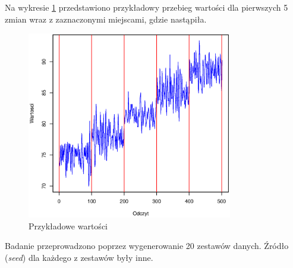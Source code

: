 Na wykresie \ref{fig:JumpingValues} przedstawiono przykładowy przebieg wartości dla pierwszych 5 zmian
wraz z zaznaczonymi miejscami,
gdzie nastąpiła.
\begin{figure}[htbp]
  \centering
  \includegraphics[width=0.8\textwidth]{img/ch-5-jumping}
  \caption{Przykładowe wartości}
  \label{fig:JumpingValues}
\end{figure}
Badanie przeprowadzono poprzez wygenerowanie 20 zestawów danych.
Źródło (\textit{seed}) dla każdego z zestawów były inne.
